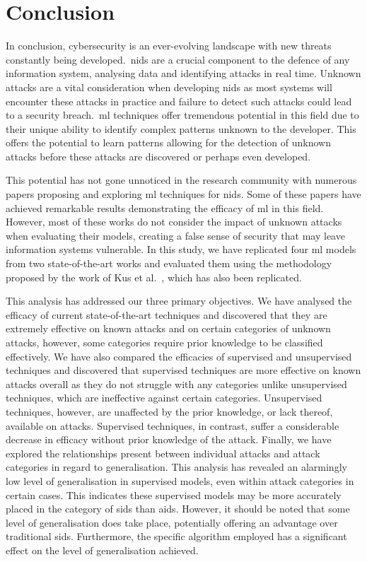 \chapter{Conclusion}%
\label{chp:conclusion}

In conclusion, cybersecurity is an ever-evolving landscape with new threats
constantly being developed.\ \gls{nids} are a crucial component to the defence
of any information system, analysing data and identifying attacks in real time.
Unknown attacks are a vital consideration when developing \gls{nids} as most
systems will encounter these attacks in practice and failure to detect such
attacks could lead to a security breach.\ \gls{ml} techniques offer tremendous
potential in this field due to their unique ability to identify complex
patterns unknown to the developer. This offers the potential to learn patterns
allowing for the detection of unknown attacks before these attacks are
discovered or perhaps even developed.

This potential has not gone unnoticed in the research community with numerous
papers proposing and exploring \gls{ml} techniques for \gls{nids}. Some of
these papers have achieved remarkable results demonstrating the efficacy of
\gls{ml} in this field. However, most of these works do not consider the impact
of unknown attacks when evaluating their models, creating a false sense of
security that may leave information systems vulnerable. In this study, we have
replicated four \gls{ml} models from two state-of-the-art works and evaluated
them using the methodology proposed by the work of Kus et al.~\cite{Kus}, which
has also been replicated.

This analysis has addressed our three primary objectives. We have analysed the
efficacy of current state-of-the-art techniques and discovered that they are
extremely effective on known attacks and on certain categories of unknown
attacks, however, some categories require prior knowledge to be classified
effectively. We have also compared the efficacies of supervised and
unsupervised techniques and discovered that supervised techniques are more
effective on known attacks overall as they do not struggle with any categories
unlike unsupervised techniques, which are ineffective against certain
categories. Unsupervised techniques, however, are unaffected by the prior
knowledge, or lack thereof, available on attacks. Supervised techniques, in
contrast, suffer a considerable decrease in efficacy without prior knowledge of
the attack. Finally, we have explored the relationships present between
individual attacks and attack categories in regard to generalisation. This
analysis has revealed an alarmingly low level of generalisation in supervised
models, even within attack categories in certain cases. This indicates these
supervised models may be more accurately placed in the category of \gls{sids}
than \gls{aids}. However, it should be noted that some level of generalisation
does take place, potentially offering an advantage over traditional \gls{sids}.
Furthermore, the specific algorithm employed has a significant effect on the
level of generalisation achieved.

